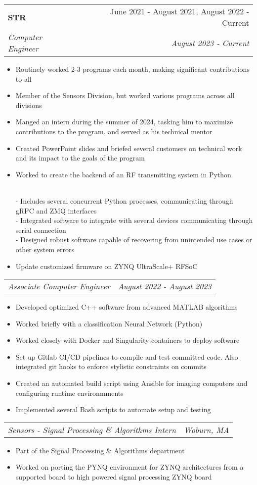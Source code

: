 \documentclass[letterpaper,11pt]{article}
\makeatletter
\newcommand{\resumeItem}[1]{
  \item\small{
    {#1 \vspace{-2pt}}
  }
}
\newcommand{\resumeSubheading}[4]{
  \vspace{-2pt}\item
    \begin{tabular*}{0.97\textwidth}[t]{l@{\extracolsep{\fill}}r}
      \textbf{#1} & #2 \\
      \textit{\small#3} & \textit{\small #4} \\
    \end{tabular*}\vspace{-7pt}
}
\newcommand{\resumeSubSubheading}[2]{
    \item
    \begin{tabular*}{0.97\textwidth}{l@{\extracolsep{\fill}}r}
      \textit{\small#1} & \textit{\small #2} \\
    \end{tabular*}\vspace{-7pt}
}
\newcommand{\resumeItemListStart}{\begin{itemize}}
\newcommand{\resumeItemListEnd}{\end{itemize}\vspace{-5pt}}
\makeatother
\begin{document}
    \resumeSubheading
      {STR}{June 2021 - August 2021, August 2022 - Current}
      {Computer Engineer}{August 2023 - Current}
        \resumeItemListStart
          \resumeItem{Routinely worked 2-3 programs each month, making significant contributions to all}
          \resumeItem{Member of the Sensors Division, but worked various programs across all divisions}
          \resumeItem{Manged an intern during the summer of 2024, tasking him to maximize contributions to the program, and served as his technical mentor}
          \resumeItem{Created PowerPoint slides and briefed several customers on technical work and its impact to the goals of the program}
          \resumeItem{Worked to create the backend of an RF transmitting system in Python}
            \\ {\quad - Includes several concurrent Python processes, communicating through gRPC and ZMQ interfaces}
            \\ {\quad - Integrated software to integrate with several devices communicating through serial connection}
            \\ {\quad - Designed robust software capable of recovering from unintended use cases or other system errors}
          \resumeItem{Update customized firmware on ZYNQ UltraScale+ RFSoC}  
        \resumeItemListEnd
      
      \resumeSubSubheading
        {Associate Computer Engineer}{August 2022 - August 2023}
        \resumeItemListStart
          \resumeItem{Developed optimized C++ software from advanced MATLAB algorithms}
          \resumeItem{Worked briefly with a classification Neural Network (Python)}
          \resumeItem{Worked closely with Docker and Singularity containers to deploy software}
          \resumeItem{Set up Gitlab CI/CD pipelines to compile and test committed code. Also integrated git hooks to enforce stylistic constraints on commits}
          \resumeItem{Created an automated build script using Ansible for imaging computers and configuring runtime environmments}
          \resumeItem{Implemented several Bash scripts to automate setup and testing}
        \resumeItemListEnd

      \resumeSubSubheading
        {Sensors - Signal Processing \& Algorithms Intern}{Woburn, MA}
        \resumeItemListStart
          \resumeItem{Part of the Signal Processing \& Algorithms department}
          \resumeItem{Worked on porting the PYNQ environment for ZYNQ architectures from a supported board to high powered signal processing ZYNQ board}
        \resumeItemListEnd
    
\end{document}
